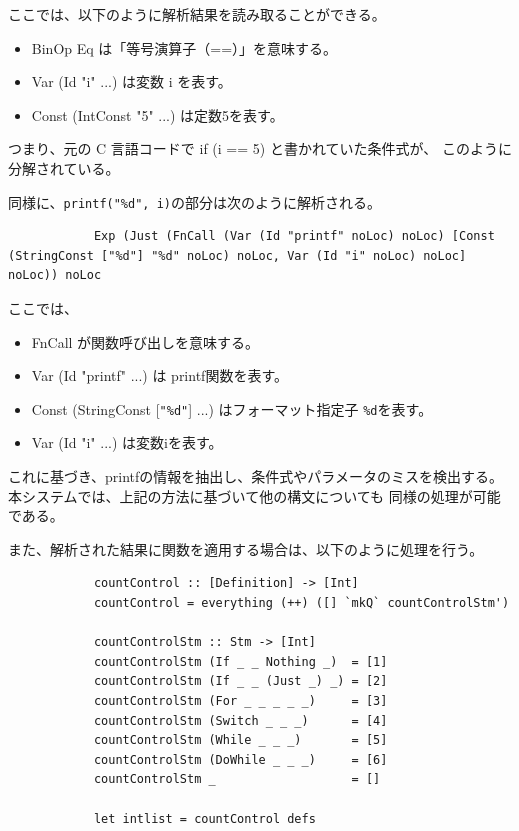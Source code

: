 \documentclass{cssspaper}
\begin{document}
        ここでは、以下のように解析結果を読み取ることができる。

        \begin{itemize}
            \item BinOp Eq は「等号演算子（==）」を意味する。
            \item Var (Id "i" ...) は変数 i を表す。
            \item Const (IntConst "5" ...) は定数5を表す。
        \end{itemize}

        つまり、元の C 言語コードで if (i == 5) と書かれていた条件式が、
        このように分解されている。

        同様に、\verb|printf("%d", i)|の部分は次のように解析される。

        \begin{lstlisting}
            Exp (Just (FnCall (Var (Id "printf" noLoc) noLoc) [Const (StringConst ["%d"] "%d" noLoc) noLoc, Var (Id "i" noLoc) noLoc] noLoc)) noLoc
        \end{lstlisting}

        ここでは、

        \begin{itemize}
            \item FnCall が関数呼び出しを意味する。
            \item Var (Id "printf" ...) は printf関数を表す。
            \item Const (StringConst [\verb|"%d"|] ...) はフォーマット指定子 \verb|%d|を表す。
            \item Var (Id "i" ...) は変数iを表す。
        \end{itemize}

        これに基づき、printfの情報を抽出し、条件式やパラメータのミスを検出する。
        本システムでは、上記の方法に基づいて他の構文についても
        同様の処理が可能である。

        また、解析された結果に関数を適用する場合は、以下のように処理を行う。
        \begin{lstlisting}
            countControl :: [Definition] -> [Int]
            countControl = everything (++) ([] `mkQ` countControlStm')

            countControlStm :: Stm -> [Int]
            countControlStm (If _ _ Nothing _)  = [1]
            countControlStm (If _ _ (Just _) _) = [2]
            countControlStm (For _ _ _ _ _)     = [3]
            countControlStm (Switch _ _ _)      = [4]
            countControlStm (While _ _ _)       = [5]
            countControlStm (DoWhile _ _ _)     = [6]
            countControlStm _                   = []

            let intlist = countControl defs
        \end{lstlisting}
\end{document}
